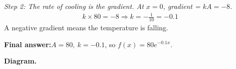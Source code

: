 \documentclass[11pt]{article}
\begin{document}
\textit{Step 2: The rate of cooling is the gradient. At \( x = 0 \), gradient = \( kA = -8 \).}
\[\begin{gathered}
k \times 80 = -8 \Rightarrow k = -\frac{1}{10} = -0.1
\end{gathered}\]
A negative gradient means the temperature is falling.

\begin{answerbox}
\textbf{Final answer:}\quad \(\displaystyle  A = 80,\ k = -0.1 \), so \(\displaystyle  f(x) = 80e^{-0.1x} \).
\end{answerbox}
\textbf{Diagram.}

\begin{center}
\end{center}
\end{document}
